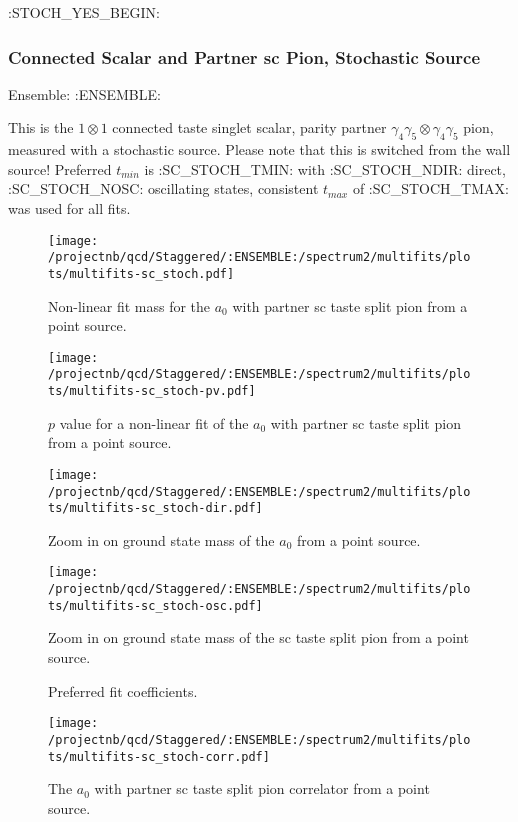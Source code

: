 \clearpage

:STOCH_YES_BEGIN:
\subsubsection{Connected Scalar and Partner sc Pion, Stochastic Source}

Ensemble: :ENSEMBLE:

This is the $1 \otimes 1$ connected taste singlet scalar, parity partner $\gamma_4 \gamma_5 \otimes \gamma_4 \gamma_5$ pion, measured with a stochastic source. Please note that this is switched from the wall source! Preferred $t_{min}$ is :SC_STOCH_TMIN: with :SC_STOCH_NDIR: direct, :SC_STOCH_NOSC: oscillating states, consistent $t_{max}$ of :SC_STOCH_TMAX: was used for all fits.

\begin{multicols}{2}
\begin{figure}[H]
\centering
\texttt{[image: /projectnb/qcd/Staggered/:ENSEMBLE:/spectrum2/multifits/plots/multifits-sc\_stoch.pdf]}
\caption{Non-linear fit mass for the $a_0$ with partner sc taste split pion from a point source.}
\end{figure}
\columnbreak
\begin{figure}[H]
\centering
\texttt{[image: /projectnb/qcd/Staggered/:ENSEMBLE:/spectrum2/multifits/plots/multifits-sc\_stoch-pv.pdf]}
\caption{$p$ value for a non-linear fit of the $a_0$ with partner sc taste split pion from a point source.}
\end{figure}
\end{multicols}

\begin{multicols}{2}
\begin{figure}[H]
\centering
\texttt{[image: /projectnb/qcd/Staggered/:ENSEMBLE:/spectrum2/multifits/plots/multifits-sc\_stoch-dir.pdf]}
\caption{Zoom in on ground state mass of the $a_0$ from a point source.}
\end{figure}
\columnbreak
\begin{figure}[H]
\centering
\texttt{[image: /projectnb/qcd/Staggered/:ENSEMBLE:/spectrum2/multifits/plots/multifits-sc\_stoch-osc.pdf]}
\caption{Zoom in on ground state mass of the sc taste split pion from a point source.}
\end{figure}
\end{multicols}

\begin{multicols}{2}
\begin{figure}[H]
\centering
\scriptsize

\caption{Preferred fit coefficients.}
\end{figure}
\columnbreak
\begin{figure}[H]
\centering
\texttt{[image: /projectnb/qcd/Staggered/:ENSEMBLE:/spectrum2/multifits/plots/multifits-sc\_stoch-corr.pdf]}
\caption{The $a_0$ with partner sc taste split pion correlator from a point source.}
\end{figure}
\end{multicols}

